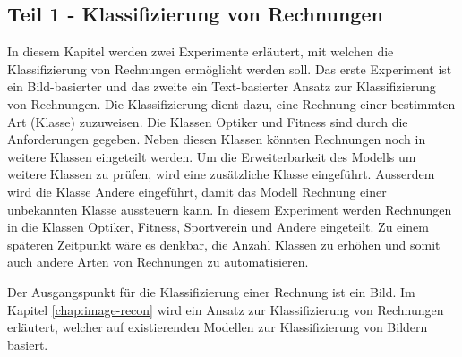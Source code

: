 \subsection{Teil 1 - Klassifizierung von Rechnungen}

In diesem Kapitel werden zwei Experimente erläutert, mit welchen die Klassifizierung von Rechnungen ermöglicht werden soll. Das erste Experiment ist ein Bild-basierter und das zweite ein Text-basierter Ansatz zur Klassifizierung von Rechnungen. Die Klassifizierung dient dazu, eine Rechnung einer bestimmten Art (Klasse) zuzuweisen. Die Klassen Optiker und Fitness sind durch die Anforderungen gegeben. Neben diesen Klassen könnten Rechnungen noch in weitere Klassen eingeteilt werden. Um die Erweiterbarkeit des Modells um weitere Klassen zu prüfen, wird eine zusätzliche Klasse eingeführt. Ausserdem wird die Klasse Andere eingeführt, damit das Modell Rechnung einer unbekannten Klasse aussteuern kann. In diesem Experiment werden Rechnungen in die Klassen Optiker, Fitness, Sportverein und Andere eingeteilt. Zu einem späteren Zeitpunkt wäre es denkbar, die Anzahl Klassen zu erhöhen und somit auch andere Arten von Rechnungen zu automatisieren.

Der Ausgangspunkt für die Klassifizierung einer Rechnung ist ein Bild. Im Kapitel \ref{chap:image-recon} wird ein Ansatz zur Klassifizierung von Rechnungen erläutert, welcher auf existierenden Modellen zur Klassifizierung von Bildern basiert.




